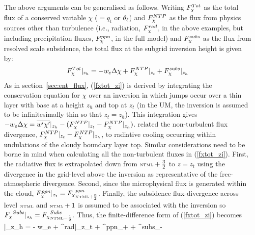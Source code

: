 \documentclass{UMDP_article}
\begin{document}
The above arguments can be generalised as follows.  Writing $F_{\chi}^{Tot}$
as the total flux of a conserved variable $\chi$ ($=q_t$ or $\theta_{\ell}$)
and $F_{\chi}^{NTP}$ as the flux from physics sources other than turbulence
(\mbox{i.e.}, radiation, $F_{\chi}^{rad}$, in the above examples, but
including precipitation fluxes, $F_{\chi}^{ppn}$, in the full model) and
$F_{\chi}^{subs}$ as the flux from resolved scale subsidence, the total
flux at the subgrid inversion height is given by:
\begin{equation}
  F_{\chi}^{Tot}|_{z_h} = - w_e \Delta \chi + F_{\chi}^{NTP}|_{z_t} + F_{\chi}^{subs}|_{z_h}
  \label{fxtot_zi}
\end{equation}
As in section~\ref{sec:ent_flux}, (\ref{fxtot_zi}) is derived by
integrating the conservation equation for $\chi$ over an inversion in
which jumps occur over a thin layer with base at a height $z_h$ and
top at $z_t$ (in the UM, the inversion is assumed to be
infinitesimally thin so that $z_t=z_h$).  This integration gives $ -
w_e \Delta \chi = \overline{w'\chi'}|_{z_h} -(F_{\chi}^{NTP}|_{z_t}-F_{\chi}^{NTP}|_{z_h})$.
\cite{lock99} related the non-turbulent flux divergence,
$F_{\chi}^{NTP}|_{z_t}-F_{\chi}^{NTP}|_{z_h}$, to radiative cooling occurring within
undulations of the cloudy boundary layer top.  Similar considerations
need to be borne in mind when calculating all the non-turbulent fluxes
in (\ref{fxtot_zi}).  First, the radiative flux is extrapolated down
from $\mbox{\tiny \rm NTML}+\frac{3}{2}$ to $z=z_t$ using the divergence in the
grid-level above the inversion as representative of the
free-atmospheric divergence.  Second, since the microphysical flux is
generated within the cloud, $F_{\chi}^{ppn}|_{z_t} =
{F_{\chi}}^{ppn}_{\mbox{\tiny \rm NTML}+\frac{3}{2}}$.  Finally, the subsidence
flux-divergence across level $\mbox{\tiny \rm NTML}$ and $\mbox{\tiny \rm NTML}+1$ is assumed to be
associated with the inversion so ${F_{\chi}}^{Subs}|_{z_h} =
{F_{\chi}}^{Subs}_{\mbox{\tiny \rm NTML}-\frac{1}{2}}$.  Thus, the finite-difference form
of (\ref{fxtot_zi}) becomes \beqn \fxtot|_{z_h} = - w_e \Delta \chi +
\fx^{rad}|_{z_t} + {\fx}^{ppn}_{\ntml+} +
{\fx}^{subs}_{\ntml-}
\label{fxtot_zi_fd}
\eeqn
\end{document}
